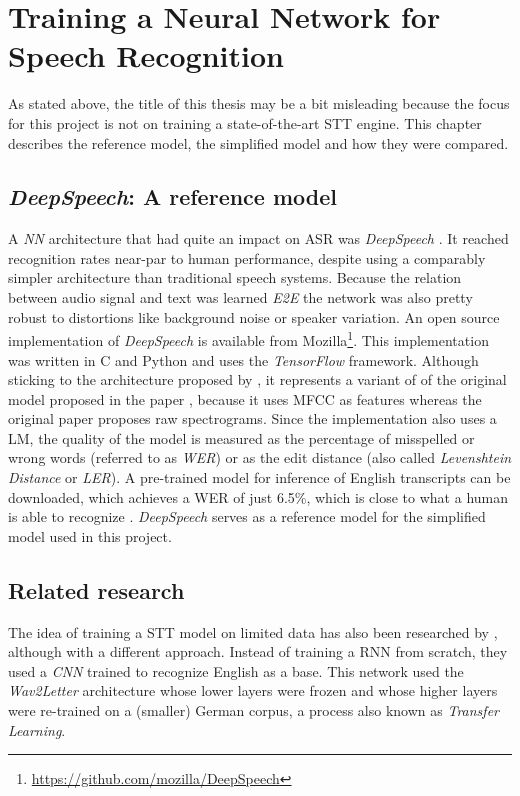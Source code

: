\section{Training a Neural Network for Speech Recognition}\label{ds}
As stated above, the title of this thesis may be a bit misleading because the focus for this project is not on training a state-of-the-art \ac{STT} engine. This chapter describes the reference model, the simplified model and how they were compared.

\subsection{\textit{DeepSpeech}: A reference model}

A \textit{\ac{NN}} architecture that had quite an impact on \ac{ASR} was \textit{DeepSpeech} \parencite{deepspeech}. It reached recognition rates near-par to human performance, despite using a comparably simpler architecture than traditional speech systems. Because the relation between audio signal and text was learned \textit{\ac{E2E}} the network was also pretty robust to distortions like background noise or speaker variation. An open source implementation of  \textit{DeepSpeech} is available from Mozilla\footnote{\url{https://github.com/mozilla/DeepSpeech}}. This implementation was written in C and Python and uses the \textit{TensorFlow} framework. Although sticking to the architecture proposed by \cite{deepspeech}, it represents a variant of of the original model proposed in the paper \parencite{ctc_paper}, because it uses \ac{MFCC} as features whereas the original paper proposes raw spectrograms. Since the implementation also uses a \ac{LM}, the quality of the model is measured as the percentage of misspelled or wrong words (referred to as \textit{\ac{WER}}) or as the edit distance (also called \textit{Levenshtein Distance} or \textit{\ac{LER}}). A pre-trained model for inference of English transcripts can be downloaded, which achieves a \ac{WER} of just 6.5\%, which is close to what a human is able to recognize \parencite{mozillajourney}. \textit{DeepSpeech} serves as a reference model for the simplified model used in this project.

\subsection{Related research}

The idea of training a \ac{STT} model on limited data has also been researched by \cite{budget}, although with a different approach. Instead of training a \ac{RNN} from scratch, they used a \textit{\ac{CNN}} trained to recognize English as a base. This network used the \textit{Wav2Letter} \parencite{wav2letter} architecture whose lower layers were frozen and whose higher layers were re-trained on a (smaller) German corpus, a process also known as \textit{Transfer Learning}. 

